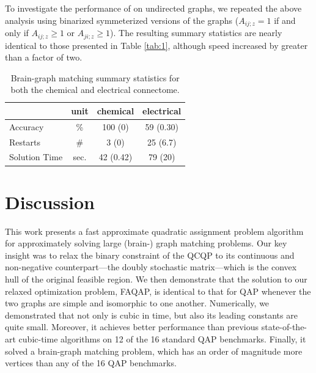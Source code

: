 \documentclass[10pt,journal,cspaper,compsoc]{IEEEtran}
\begin{document}
% 

To investigate the performance of \faqap on undirected graphs, we repeated the above analysis using binarized symmeterized versions of the graphs ($A_{ij;z}=1$ if and only if $A_{ij;z}\geq 1$ or $A_{ji;z} \geq 1$).  The resulting summary statistics are nearly identical to those presented in Table \ref{tab:1}, although speed increased by greater than a factor of two.

\begin{table}
\caption{Brain-graph matching summary statistics for both the chemical and electrical connectome. }
	\label{tab:3}
\begin{center}
\begin{tabular}{|l|c|c|c|}
	\hline  		& unit		& chemical 	& electrical \\ \hline
	Accuracy  		& \%	  	& 100  (0)  & 59 (0.30)  \\
	Restarts 	  	& \#		& 3    (0)  & 25 (6.7)   \\
	Solution Time  	& sec.		& 42 (0.42)	& 79 (20)  	 \\ \hline
\end{tabular} 
\end{center}
\end{table}

 


\section{Discussion}

This work presents a fast approximate quadratic assignment problem algorithm \faqap for approximately solving large (brain-) graph matching problems.  Our key insight was to relax the binary constraint of the QCQP to its continuous and non-negative counterpart---the doubly stochastic matrix---which is the convex hull of the original feasible region.  We then demonstrate that the solution to our relaxed optimization problem, FAQAP, is identical to that for QAP whenever the two graphs are simple and isomorphic to one another. Numerically, we demonstrated that not only is \faqap cubic in time, but also its leading constants are quite small.  Moreover, it achieves better performance than previous state-of-the-art cubic-time algorithms on 12 of the 16 standard QAP benchmarks.  Finally, it solved a brain-graph matching problem, which has an order of magnitude more vertices than any of the 16 QAP benchmarks.
\end{document}
